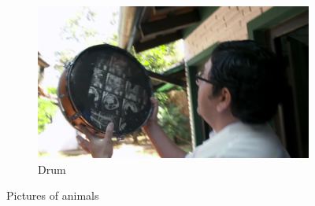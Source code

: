 \begin{itemize}
\begin{figure}
    \begin{subfigure}[b]{0.3\textwidth}
        \includegraphics[width=\textwidth]{graphics/landfill_harmonic_drum2.png}
        \caption{Drum}
        \label{fig:mouse}
    \end{subfigure}
    \caption{Pictures of animals}\label{fig:animals}
\end{figure}





\end{itemize}
